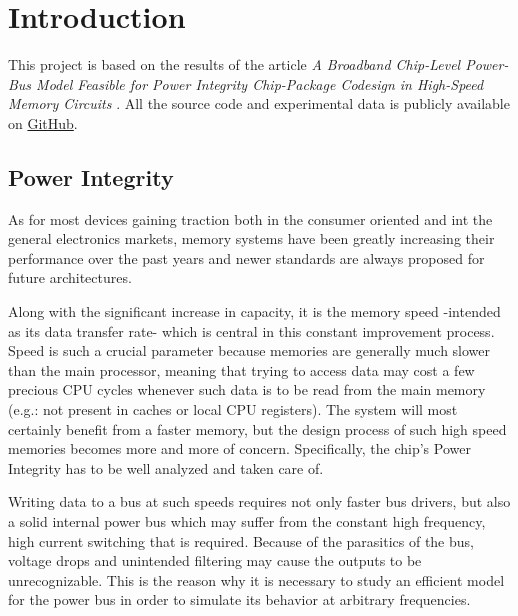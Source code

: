 \section{Introduction}
This project is based on the results of the article \emph{A Broadband Chip-Level Power-Bus Model Feasible for Power Integrity Chip-Package Codesign in High-Speed Memory Circuits} \cite{Hao-HsiangChuang2010ABCP}. All the source code and experimental data is publicly available on \href{https://github.com/arscisca/mem-pmod}{GitHub}.

\subsection{Power Integrity}
As for most devices gaining traction both in the consumer oriented and int the general electronics markets, memory systems have been greatly increasing their performance over the past years and newer standards are always proposed for future architectures.

Along with the significant increase in capacity, it is the memory speed -intended as its data transfer rate- which is central in this constant improvement process. Speed is such a crucial parameter because memories are generally much slower than the main processor, meaning that trying to access data may cost a few precious CPU cycles whenever such data is to be read from the main memory (e.g.: not present in caches or local CPU registers). The system will most certainly benefit from a faster memory, but the design process of such high speed memories becomes more and more of concern. Specifically, the chip's Power Integrity has to be well analyzed and taken care of.

Writing data to a bus at such speeds requires not only faster bus drivers, but also a solid internal power bus which may suffer from the constant high frequency, high current switching that is required. Because of the parasitics of the bus, voltage drops and unintended filtering may cause the outputs to be unrecognizable.
This is the reason why it is necessary to study an efficient model for the power bus in order to simulate its behavior at arbitrary frequencies.
